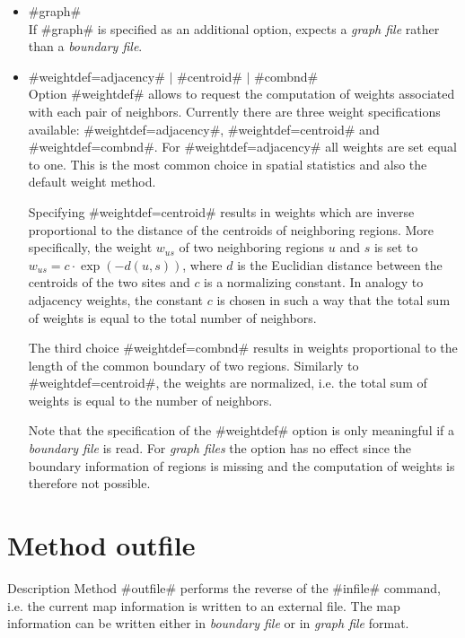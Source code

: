 \begin{itemize}
\item #graph# \\
If #graph# is specified as an additional option, \BayesX expects a {\em graph file} rather than a {\em boundary file}.

\item #weightdef=adjacency# $|$ #centroid#  $|$ #combnd# \label{weightsmap}\\
Option #weightdef# allows to request the computation of weights associated with each pair of neighbors. Currently there are three weight specifications available: #weightdef=adjacency#, #weightdef=centroid# and #weightdef=combnd#. For #weightdef=adjacency# all weights are set equal to one. This is the most common choice in spatial statistics and also the default weight method.

Specifying #weightdef=centroid# results in weights which are inverse proportional to the distance of the centroids of
neighboring regions. More specifically, the weight $w_{us}$ of two neighboring regions $u$ and $s$ is set to $w_{us} = c \cdot \exp(-d(u,s))$, where $d$ is the Euclidian distance between the centroids of the two sites and $c$ is a normalizing constant. In analogy to adjacency weights, the constant $c$ is chosen in such a way that the total sum of weights is equal to the total number of neighbors.

The third choice #weightdef=combnd# results in weights proportional to the length of the common boundary of two regions.
Similarly to #weightdef=centroid#, the weights are normalized, i.e. the total sum of weights is equal to the number of neighbors.

Note that the specification of the #weightdef# option is only meaningful if a {\em boundary file} is read. For {\em graph files} the option has no effect since the boundary information of regions is missing and the computation of weights is therefore not possible.
\end{itemize}


\section{Method outfile}
 \label{mapoutfile}

\begin{stanza}{Description}
Method #outfile# performs the reverse of the #infile# command, i.e. the current map information is written to an external file. The map information can be written either in {\em boundary file} or in {\em graph file} format.
\end{stanza}

